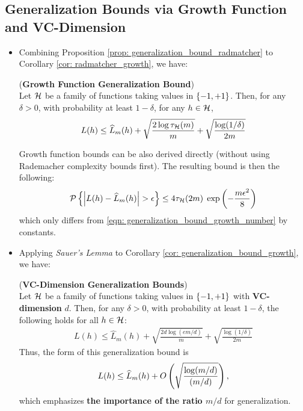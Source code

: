 \documentclass[11pt]{article}
\begin{document}
\subsection{Generalization Bounds via Growth Function and VC-Dimension}
\begin{itemize}
\item Combining Proposition \ref{prop: generalization_bound_radmatcher} to Corollary \ref{cor: radmatcher_growth}, we have:
\begin{corollary} \label{cor: generalization_bound_growth}   (\textbf{Growth Function Generalization Bound})  \citep{mohri2018foundations}\\
Let ${\mathcal H}$ be a family of functions taking values in $\left\{-1, +1\right\}$.  Then, for any $\delta > 0$, with probability at least $1 - \delta$, for any $h \in {\mathcal H}$,
\begin{align}
L(h) \le \widehat{L}_{m}(h) + \sqrt{\frac{2 \log \tau_{{\mathcal H}}(m)}{m}} +\sqrt{\frac{\log(1/\delta)}{2m}} \label{eqn: generalization_bound_growth_number}
\end{align}

Growth function bounds can be also derived directly (without using Rademacher complexity bounds first). The resulting bound is then the following:
\begin{align}
{\mathcal P}\left\{\left\lvert L(h) - \widehat{L}_{m}(h) \right\rvert > \epsilon \right\}  \le 4\tau_{{\mathcal H}}(2m)\;\exp\left(-\frac{m\epsilon^2}{8}\right) \label{eqn: generalization_bound_growth_number_2}
\end{align}
which only differs from \eqref{eqn: generalization_bound_growth_number} by constants.
\end{corollary}

\item Applying \emph{Sauer's Lemma} to Corollary \ref{cor: generalization_bound_growth}, we have:
\begin{corollary} \label{cor: generalization_bound_vc} (\textbf{VC-Dimension Generalization Bounds}) \citep{mohri2018foundations}\\
Let ${\mathcal H}$ be a family of functions taking values in $\left\{-1, +1\right\}$ with \textbf{VC-dimension} $d$. Then, for any $\delta > 0$, with probability at least $1 - \delta$, the following holds for all $h \in {\mathcal H}$:
\begin{align}
L(h) \le \widehat{L}_{m}(h) + \sqrt{\frac{2d \log(em /d)}{m}} +\sqrt{\frac{\log(1/\delta)}{2m}} \label{eqn: generalization_bound_vc_dim}
\end{align}
Thus, the form of this generalization bound is
\begin{align}
L(h) \le \widehat{L}_{m}(h) + O\left(\sqrt{\frac{\log(m /d)}{(m/d)}}\right),  \label{eqn: generalization_bound_vc_dim2}
\end{align}
which emphasizes \textbf{the importance of the ratio $m/d$} for generalization. 
\end{corollary}


\end{itemize}
\end{document}

